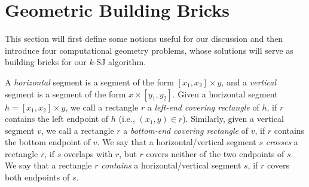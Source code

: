 \documentclass[sigconf]{acmart}
\def\extraspacing{\vspace{2mm} \noindent}
\begin{document}
\section{Geometric Building Bricks} \label{sec:bricks}

This section will first define some notions useful for our discussion and then introduce four computational geometry problems, whose solutions will serve as building bricks for our $k$-SJ algorithm.

\extraspacing {\bf Terminology.} A {\em horizontal} segment is a segment of the form $[x_1, x_2] \times y$, and a {\em vertical} segment is a segment of the form $x \times [y_1, y_2]$. Given a horizontal segment $h = [x_1, x_2] \times y$, we call a rectangle $r$ a {\em left-end covering rectangle} of $h$, if $r$ contains the left endpoint of $h$ (i.e., $(x_1, y) \in r$). Similarly, given a vertical segment $v$, we call a rectangle $r$ a {\em bottom-end covering rectangle} of $v$, if $r$ contains the bottom endpoint of $v$. We say that a horizontal/vertical segment $s$ {\em crosses} a rectangle $r$, if $s$ overlaps with $r$, but $r$ covers neither of the two endpoints of $s$. We say that a rectangle $r$ {\em contains} a horizontal/vertical segment $s$, if $r$ covers both endpoints of $s$.
\end{document}

